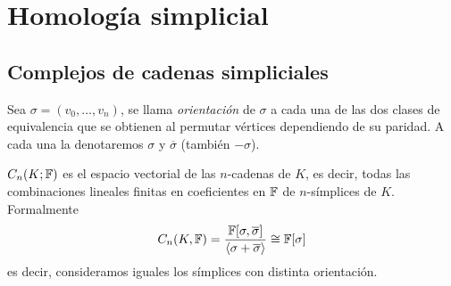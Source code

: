 \documentclass[HS.tex]{subfiles}
\begin{document}
\chapter{Homología simplicial}

\section{Complejos de cadenas simpliciales}

\begin{defi}
Sea $\sigma=(v_0,\dots, v_n)$, se llama \emph{orientación} de $\sigma$ a cada una de las dos clases de equivalencia que se obtienen al permutar vértices dependiendo de su paridad. A cada una la denotaremos $\sigma$ y $\overline{\sigma}$ (también $-\sigma$).
\end{defi}

\begin{defi}
$C_n(K;\mathbb{F})$ es el espacio vectorial de las $n$-cadenas  de $K$, es decir, todas las combinaciones lineales finitas en coeficientes en $\mathbb{F}$ de $n$-símplices de $K$. Formalmente
\[
C_n(K,\mathbb{F})=\frac{\mathbb{F}[\sigma,\overline{\sigma}]}{\langle{\sigma+\overline{\sigma}}\rangle}\cong \mathbb{F}[\sigma]
\]
es decir, consideramos iguales los símplices con distinta orientación.
\end{defi}
\end{document}
